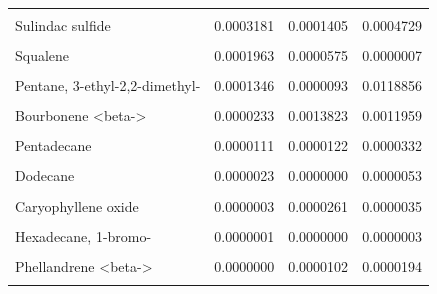 \documentclass[12pt,final,CPage]{ufthesis}
\begin{document}
{\begin{longtable}[t]{lrrr}
  \cellcolor{gray!6}{Decanal} & \cellcolor{gray!6}{0.0004416} & \cellcolor{gray!6}{0.0358075} & \cellcolor{gray!6}{0.0548420}\\
  Sulindac sulfide & 0.0003181 & 0.0001405 & 0.0004729\\
  \addlinespace
  \cellcolor{gray!6}{p-Cymene} & \cellcolor{gray!6}{0.0002002} & \cellcolor{gray!6}{0.0000645} & \cellcolor{gray!6}{0.0002396}\\
  Squalene & 0.0001963 & 0.0000575 & 0.0000007\\
  \cellcolor{gray!6}{Nonanal} & \cellcolor{gray!6}{0.0001381} & \cellcolor{gray!6}{0.0000000} & \cellcolor{gray!6}{0.0000506}\\
  Pentane, 3-ethyl-2,2-dimethyl- & 0.0001346 & 0.0000093 & 0.0118856\\
  \cellcolor{gray!6}{Carene <delta-3>} & \cellcolor{gray!6}{0.0000350} & \cellcolor{gray!6}{0.0008066} & \cellcolor{gray!6}{0.0002344}\\
  \addlinespace
  Bourbonene <beta-> & 0.0000233 & 0.0013823 & 0.0011959\\
  \cellcolor{gray!6}{Cadina-1,4-diene <trans->} & \cellcolor{gray!6}{0.0000136} & \cellcolor{gray!6}{0.0000000} & \cellcolor{gray!6}{0.0000238}\\
  Pentadecane & 0.0000111 & 0.0000122 & 0.0000332\\
  \cellcolor{gray!6}{Acetic acid, hexyl ester} & \cellcolor{gray!6}{0.0000026} & \cellcolor{gray!6}{0.0000000} & \cellcolor{gray!6}{0.0000045}\\
  Dodecane & 0.0000023 & 0.0000000 & 0.0000053\\
  \addlinespace
  \cellcolor{gray!6}{Cubebene <beta->} & \cellcolor{gray!6}{0.0000015} & \cellcolor{gray!6}{0.0000606} & \cellcolor{gray!6}{0.0000145}\\
  Caryophyllene oxide & 0.0000003 & 0.0000261 & 0.0000035\\
  \cellcolor{gray!6}{Zonarene} & \cellcolor{gray!6}{0.0000002} & \cellcolor{gray!6}{0.0000075} & \cellcolor{gray!6}{0.0000036}\\
  Hexadecane, 1-bromo- & 0.0000001 & 0.0000000 & 0.0000003\\
  \cellcolor{gray!6}{Bergamotene <alpha-, cis->} & \cellcolor{gray!6}{0.0000000} & \cellcolor{gray!6}{0.0000001} & \cellcolor{gray!6}{0.0000004}\\
  \addlinespace
  Phellandrene <beta-> & 0.0000000 & 0.0000102 & 0.0000194\\
  \cellcolor{gray!6}{Terpineol <alpha->} & \cellcolor{gray!6}{0.0000000} & \cellcolor{gray!6}{0.0000000} & \cellcolor{gray!6}{0.0000000}\\

\end{longtable}}
\end{document}
